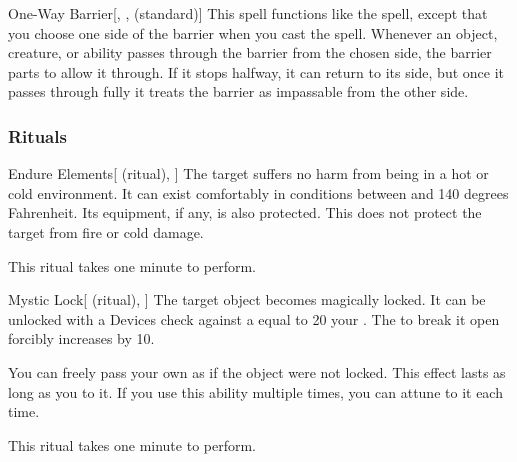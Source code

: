 \lowercase{\hypertarget{spell:One-Way Barrier}{}}\label{spell:One-Way Barrier}
\begin{freeability}[Rank 7]{\hypertarget{spell:One-Way Barrier}{One-Way Barrier}}[, ,  (standard)]
\targetrule
This spell functions like the  spell, except that you choose one side of the barrier when you cast the spell.
Whenever an object, creature, or ability passes through the barrier from the chosen side, the barrier parts to allow it through.
If it stops halfway, it can return to its side, but once it passes through fully it treats the barrier as impassable from the other side.
\end{freeability}
\vspace{0.25em}



\subsubsection{Rituals}


\lowercase{\hypertarget{spell:Endure Elements}{}}\label{spell:Endure Elements}
\begin{attuneability}[Rank 1]{\hypertarget{spell:Endure Elements}{Endure Elements}}[ (ritual), ]
The target suffers no harm from being in a hot or cold environment.
It can exist comfortably in conditions between  and 140 degrees Fahrenheit.
Its equipment, if any, is also protected.
This does not protect the target from fire or cold damage.

This ritual takes one minute to perform.
\end{attuneability}
\vspace{0.25em}



\lowercase{\hypertarget{spell:Mystic Lock}{}}\label{spell:Mystic Lock}
\begin{attuneability}[Rank 3]{\hypertarget{spell:Mystic Lock}{Mystic Lock}}[ (ritual), ]
The target object becomes magically locked.
It can be unlocked with a Devices check against a  equal to 20 \add your .
The  to break it open forcibly increases by 10.

You can freely pass your own  as if the object were not locked.
This effect lasts as long as you  to it.
If you use this ability multiple times, you can attune to it each time.

This ritual takes one minute to perform.
\end{attuneability}
\vspace{0.25em}



